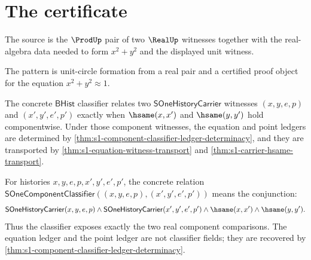\section{The certificate}

\begin{definition}
\label{def:s1-source-specification}
The source is the $\ProdUp$ pair of two $\RealUp$ witnesses together with the real-algebra data needed to form $x^2 + y^2$ and the displayed unit witness.
\end{definition}

\begin{definition}
\label{def:s1-pattern-specification}
The pattern is unit-circle formation from a real pair and a certified proof object for the equation $x^2 + y^2 \approx 1$.
\end{definition}

\begin{definition}
\label{def:s1-classifier-specification}
The concrete $\mathsf{BHist}$ classifier relates two
$\mathsf{SOneHistoryCarrier}$ witnesses $(x,y,e,p)$ and $(x',y',e',p')$
exactly when $\hsame(x,x')$ and $\hsame(y,y')$ hold componentwise. Under those
component witnesses, the equation and point ledgers are determined by
\autoref{thm:s1-component-classifier-ledger-determinacy}, and they are
transported by \autoref{thm:s1-equation-witness-transport} and
\autoref{thm:s1-carrier-hsame-transport}.
\end{definition}

\begin{definition}
\label{def:sone-component-classifier-relation}
For histories $x,y,e,p,x',y',e',p'$, the concrete relation
$\mathsf{SOneComponentClassifier}((x,y,e,p),(x',y',e',p'))$ means the
conjunction:
$$
\mathsf{SOneHistoryCarrier}(x,y,e,p)
\wedge
\mathsf{SOneHistoryCarrier}(x',y',e',p')
\wedge
\hsame(x,x') \wedge \hsame(y,y').
$$
Thus the classifier exposes exactly the two real component comparisons. The
equation ledger and the point ledger are not classifier fields; they are
recovered by \autoref{thm:s1-component-classifier-ledger-determinacy}.
\end{definition}

